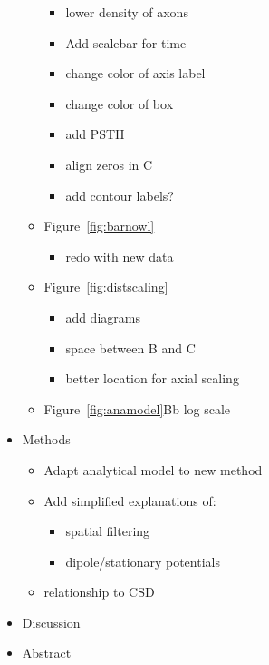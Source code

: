 \documentclass[]{article}
\providecommand{\tightlist}{%
  \setlength{\itemsep}{0pt}\setlength{\parskip}{0pt}}
\begin{document}
\begin{itemize}
\begin{itemize}
    \begin{itemize}
    \tightlist
    \item
      lower density of axons
    \item
      Add scalebar for time
    \item
      change color of axis label
    \item
      change color of box
    \item
      add PSTH
    \item
      align zeros in C
    \item
      add contour labels?
    \end{itemize}
  \item
    Figure~\ref{fig:barnowl}

    \begin{itemize}
    \tightlist
    \item
      redo with new data
    \end{itemize}
  \item
    Figure~\ref{fig:distscaling}

    \begin{itemize}
    \tightlist
    \item
      add diagrams
    \item
      space between B and C
    \item
      better location for axial scaling
    \end{itemize}
  \item
    Figure~\ref{fig:anamodel}Bb log scale
  \end{itemize}
\item
  Methods

  \begin{itemize}
  \tightlist
  \item
    Adapt analytical model to new method
  \item
    Add simplified explanations of:

    \begin{itemize}
    \tightlist
    \item
      spatial filtering
    \item
      dipole/stationary potentials
    \end{itemize}
  \item
    relationship to CSD
  \end{itemize}
\item
  Discussion
\item
  Abstract
\end{itemize}
\end{document}
